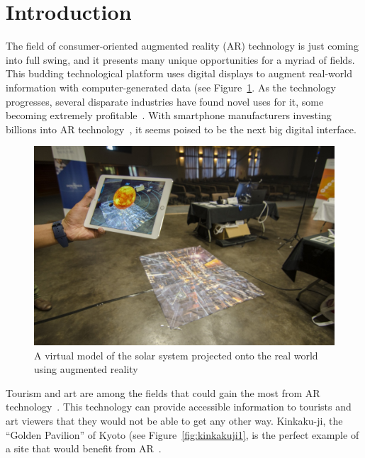 \documentclass[a4paper, 10pt, american, titlepage]{article}
\begin{document}

\section{Introduction}
\label{sec:introduction}

The field of consumer-oriented augmented reality (AR) technology is just coming
into full swing, and it presents many unique opportunities for a myriad of
fields. This budding technological platform uses digital displays to augment
real-world information with computer-generated data (see
Figure~\ref{fig:arExample}. As the technology progresses, several disparate
industries have found novel uses for it, some becoming extremely
profitable~\autocite{webster2018}. With smartphone manufacturers investing
billions into AR technology~\autocite{mason2016}, it seems poised to be the next
big digital interface.

\begin{figure}[h]
	\centering
	\includegraphics[width=\textwidth]{ar-example.jpg}
	\caption[A virtual model of the solar system projected onto the real world
	using AR]{A virtual model of the solar system projected onto the real world
		using augmented reality~\autocite{tedx2016}}
	\label{fig:arExample}
\end{figure}

Tourism and art are among the fields that could gain the most from AR
technology~\autocite{saenz2009, katz2018}. This technology can provide
accessible information to tourists and art viewers that they would not be able
to get any other way. Kinkaku-ji, the ``Golden Pavilion'' of Kyoto (see
Figure~\ref{fig:kinkakuji1}, is the perfect example of a site that would benefit
from AR~\autocite{bornoff2000}.
\end{document}
